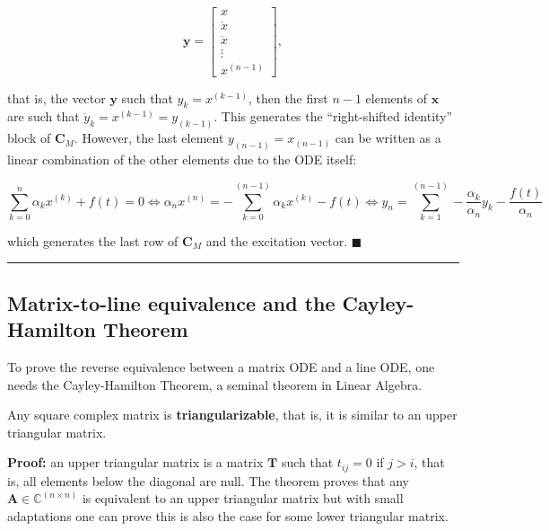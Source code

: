 \begin{equation} \mathbf{y} = \left[\begin{array}{c} x \\[3mm] \dot{x} \\[3mm] \ddot{x} \\[3mm] \vdots \\[3mm] x^{(n-1)}\end{array}\right], \end{equation}

	\noindent that is, the vector $\mathbf{y}$ such that $y_k = x^{(k-1)}$, then the first $n-1$ elements of $\mathbf{x}$ are such that $\dot{y}_k = x^{(k-1)} = y_{(k-1)}$. This generates the ``right-shifted identity'' block of $\mathbf{C}_M$. However, the last element $y_{(n-1)} = x_{(n-1)}$ can be written as a linear combination of the other elements due to the ODE itself:

\begin{equation} \sum\limits_{k=0}^n \alpha_k x^{\left(k\right)} + f(t) = 0 \Leftrightarrow \alpha_n x^{\left(n\right)} = -\sum\limits_{k=0}^{(n-1)} \alpha_k x^{\left(k\right)} - f(t) \Leftrightarrow y_n = \sum_{k=1}^{(n-1)} -\dfrac{\alpha_k}{\alpha_n}y_k - \dfrac{f(t)}{\alpha_n} \end{equation}

	\noindent which generates the last row of $\mathbf{C}_M$ and the excitation vector.
\hfill$\blacksquare$
\vspace{5mm}
\hrule
\vspace{5mm} %

\subsection{Matrix-to-line equivalence and the Cayley-Hamilton Theorem} %

	To prove the reverse equivalence between a matrix ODE and a line ODE, one needs the Cayley-Hamilton Theorem, a seminal theorem in Linear Algebra.

\begin{lemma}\label{lemma:schur_decomp} %
	Any square complex matrix is \textbf{triangularizable}, that is, it is similar to an upper triangular matrix.\end{lemma}
\noindent\textbf{Proof:} an upper triangular matrix is a matrix $\mathbf{T}$ such that $t_{ij} = 0$ if $j > i$, that is, all elements below the diagonal are null. The theorem proves that any $\mathbf{A}\in\mathbb{C}^{(n\times n)}$ is equivalent to an upper triangular matrix but with small adaptations one can prove this is also the case for some lower triangular matrix.

